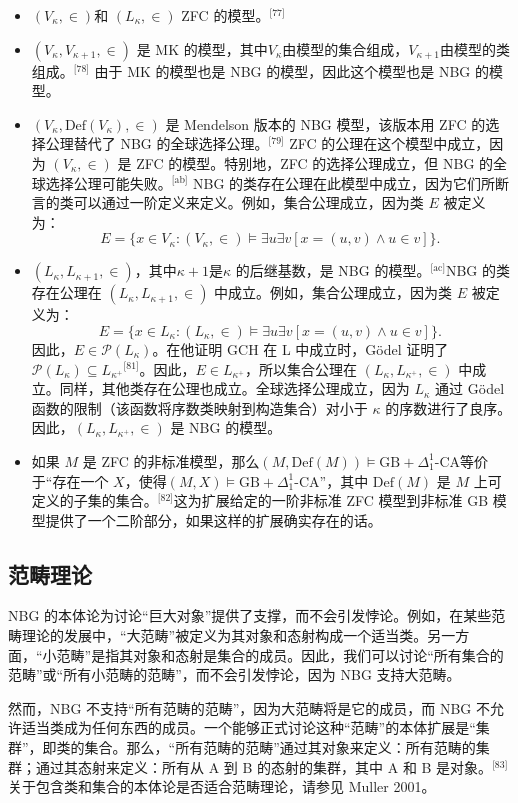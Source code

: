 \begin{itemize}
\item \((V_{\kappa}, \in)\)和 \((L_{\kappa}, \in)\) ZFC 的模型。\(^\text{[77]}\)
\item \((V_{\kappa}, V_{\kappa + 1}, \in)\) 是 MK 的模型，其中\(V_{\kappa}\)由模型的集合组成，\(V_{\kappa + 1}\)由模型的类组成。\(^\text{[78]}\)
由于 MK 的模型也是 NBG 的模型，因此这个模型也是 NBG 的模型。
\item \((V_{\kappa}, \text{Def}(V_{\kappa}), \in)\) 是 Mendelson 版本的 NBG 模型，该版本用 ZFC 的选择公理替代了 NBG 的全球选择公理。\(^\text{[79]}\)
ZFC 的公理在这个模型中成立，因为 \((V_{\kappa}, \in)\) 是 ZFC 的模型。特别地，ZFC 的选择公理成立，但 NBG 的全球选择公理可能失败。\(^\text{[ab]}\) NBG 的类存在公理在此模型中成立，因为它们所断言的类可以通过一阶定义来定义。例如，集合公理成立，因为类 \(E\) 被定义为：
\[
E = \{ x \in V_{\kappa} : (V_{\kappa}, \in) \models \exists u \exists v [x = (u,v) \land u \in v] \}.~
\]
\item \((L_{\kappa}, L_{\kappa + 1}, \in)\)，其中\(\kappa + 1\)是\(\kappa\) 的后继基数，是 NBG 的模型。\(^\text{[ac]}\)NBG 的类存在公理在 \((L_{\kappa}, L_{\kappa + 1}, \in)\) 中成立。例如，集合公理成立，因为类 \(E\) 被定义为：
\[
E = \{ x \in L_{\kappa} : (L_{\kappa}, \in) \models \exists u \exists v [x = (u,v) \land u \in v] \}.~
\]
因此，\(E \in \mathcal{P}(L_{\kappa})\)。在他证明 GCH 在 L 中成立时，Gödel 证明了 \( \mathcal{P}(L_{\kappa}) \subseteq L_{\kappa^+} \)\(^\text{[81]}\)。因此，\(E \in L_{\kappa^+}\)，所以集合公理在 \((L_{\kappa}, L_{\kappa^+}, \in)\) 中成立。同样，其他类存在公理也成立。全球选择公理成立，因为 \(L_{\kappa}\) 通过 Gödel 函数的限制（该函数将序数类映射到构造集合）对小于 \(\kappa\) 的序数进行了良序。因此，\((L_{\kappa}, L_{\kappa^+}, \in)\) 是 NBG 的模型。
\item 如果 \(M\) 是 ZFC 的非标准模型，那么\((M, \text{Def}(M)) \models \text{GB} + \Delta_1^1\text{-CA}\)等价于“存在一个 \(X\)，使得\((M, X) \models \text{GB} + \Delta_1^1\text{-CA}\)”，其中 \(\text{Def}(M)\) 是 \(M\) 上可定义的子集的集合。\(^\text{[82]}\)这为扩展给定的一阶非标准 ZFC 模型到非标准 GB 模型提供了一个二阶部分，如果这样的扩展确实存在的话。
\end{itemize}
\subsection{范畴理论}  
NBG 的本体论为讨论“巨大对象”提供了支撑，而不会引发悖论。例如，在某些范畴理论的发展中，“大范畴”被定义为其对象和态射构成一个适当类。另一方面，“小范畴”是指其对象和态射是集合的成员。因此，我们可以讨论“所有集合的范畴”或“所有小范畴的范畴”，而不会引发悖论，因为 NBG 支持大范畴。

然而，NBG 不支持“所有范畴的范畴”，因为大范畴将是它的成员，而 NBG 不允许适当类成为任何东西的成员。一个能够正式讨论这种“范畴”的本体扩展是“集群”，即类的集合。那么，“所有范畴的范畴”通过其对象来定义：所有范畴的集群；通过其态射来定义：所有从 A 到 B 的态射的集群，其中 A 和 B 是对象。\(^\text{[83]}\)关于包含类和集合的本体论是否适合范畴理论，请参见 Muller 2001。